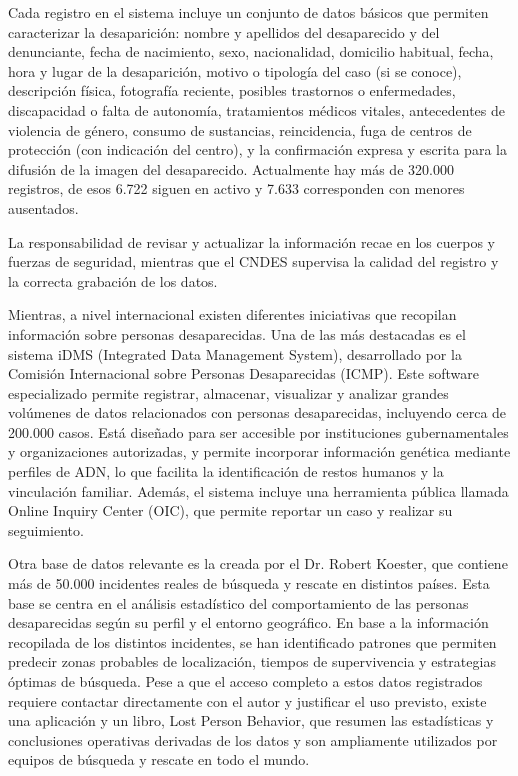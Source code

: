     Cada registro en el sistema incluye un conjunto de datos básicos que permiten caracterizar la desaparición: nombre y apellidos del desaparecido y del denunciante, fecha de nacimiento, sexo, nacionalidad, domicilio habitual, fecha, hora y lugar de la desaparición, motivo o tipología del caso (si se conoce), descripción física, fotografía reciente, posibles trastornos o enfermedades, discapacidad o falta de autonomía, tratamientos médicos vitales, antecedentes de violencia de género, consumo de sustancias, reincidencia, fuga de centros de protección (con indicación del centro), y la confirmación expresa y escrita para la difusión de la imagen del desaparecido. Actualmente hay más de 320.000 registros, de esos 6.722 siguen en activo y 7.633 corresponden con menores ausentados.\cite{InformeCNDES2025}
    
    La responsabilidad de revisar y actualizar la información recae en los cuerpos y fuerzas de seguridad, mientras que el CNDES supervisa la calidad del registro y la correcta grabación de los datos.

    Mientras, a nivel internacional existen diferentes iniciativas que recopilan información sobre personas desaparecidas. Una de las más destacadas es el sistema iDMS (Integrated Data Management System), desarrollado por la Comisión Internacional sobre Personas Desaparecidas (ICMP). Este software especializado permite registrar, almacenar, visualizar y analizar grandes volúmenes de datos relacionados con personas desaparecidas, incluyendo cerca de 200.000 casos. Está diseñado para ser accesible por instituciones gubernamentales y organizaciones autorizadas, y permite incorporar información genética mediante perfiles de ADN, lo que facilita la identificación de restos humanos y la vinculación familiar. Además, el sistema incluye una herramienta pública llamada Online Inquiry Center (OIC), que permite reportar un caso y realizar su seguimiento.\cite{icmp_idms} 


    Otra base de datos relevante es la creada por el Dr. Robert Koester, que contiene más de 50.000 incidentes reales de búsqueda y rescate en distintos países. Esta base se centra en el análisis estadístico del comportamiento de las personas desaparecidas según su perfil y el entorno geográfico. En base a la información recopilada de los distintos incidentes, se han identificado patrones que permiten predecir zonas probables de localización, tiempos de supervivencia y estrategias óptimas de búsqueda\cite{isrid_dbs}. Pese a que el acceso completo a estos datos registrados requiere contactar directamente con el autor y justificar el uso previsto, existe una aplicación y un libro, Lost Person Behavior, que resumen las estadísticas y conclusiones operativas derivadas de los datos y son ampliamente utilizados por equipos de búsqueda y rescate en todo el mundo. \cite{lostPersonBehavior}

